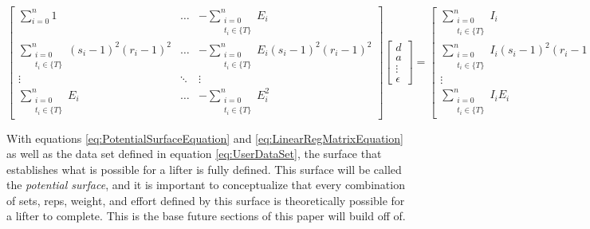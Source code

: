 \begin{equation}
    \label{eq:LinearRegMatrixEquation}
    \left[
    \begin{matrix}
        \sum_{i=0}^n 1 &
        \dots &
        -\sum_{\substack{i=0\\ t_i\in \{ T \}}}^n E_i \\

        \sum_{\substack{i=0\\ t_i\in \{ T \}}}^n (s_i-1)^2(r_i-1)^2 &
        \dots &
        -\sum_{\substack{i=0\\ t_i\in \{ T \}}}^n E_i (s_i-1)^2(r_i-1)^2\\

        \vdots &
        \ddots &
        \vdots \\
        
        \sum_{\substack{i=0\\ t_i\in \{ T \}}}^n E_i &
        \dots &
        -\sum_{\substack{i=0\\ t_i\in \{ T \}}}^n E_i^2
    \end{matrix}
    \right]
    \left[
    \begin{matrix}
        d \\ a \\ \vdots \\ \epsilon
    \end{matrix}
    \right]=\left[
    \begin{matrix}
        \sum_{\substack{i=0\\ t_i\in \{ T \}}}^n I_i \\
        \sum_{\substack{i=0\\ t_i\in \{ T \}}}^n I_i(s_i-1)^2(r_i-1)^2 \\
        \vdots \\
        \sum_{\substack{i=0\\ t_i\in \{ T \}}}^n I_i E_i
    \end{matrix}
    \right]
\end{equation}

With equations \ref{eq:PotentialSurfaceEquation} and \ref{eq:LinearRegMatrixEquation} as well as the data set defined in equation \ref{eq:UserDataSet}, the surface that establishes what is possible for a lifter is fully defined. This surface will be called the \textit{potential surface}, and it is important to conceptualize that every combination of sets, reps, weight, and effort defined by this surface is theoretically possible for a lifter to complete. This is the base future sections of this paper will build off of.

